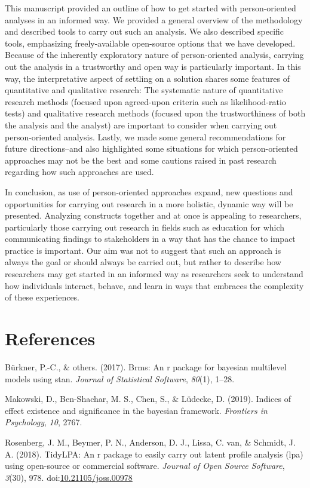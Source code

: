 \documentclass[man]{apa6}
\begin{document}
This manuscript provided an outline of how to get started with person-oriented
analyses in an informed way. We provided a general overview of the methodology
and described tools to carry out such an analysis. We also described specific
tools, emphasizing freely-available open-source options that we have developed.
Because of the inherently exploratory nature of person-oriented analysis,
carrying out the analysis in a trustworthy and open way is particularly
important. In this way, the interpretative aspect of settling on a solution
shares some features of quantitative and qualitative research: The systematic
nature of quantitative research methods (focused upon agreed-upon criteria such
as likelihood-ratio tests) and qualitative research methods (focused upon the
trustworthiness of both the analysis and the analyst) are important to consider
when carrying out person-oriented analysis. Lastly, we made some general
recommendations for future directions--and also highlighted some situations for
which person-oriented approaches may not be the best and some cautions raised in
past research regarding how such approaches are used.

In conclusion, as use of person-oriented approaches expand, new questions and
opportunities for carrying out research in a more holistic, dynamic way will be
presented. Analyzing constructs together and at once is appealing to
researchers, particularly those carrying out research in fields such as
education for which communicating findings to stakeholders in a way that has the
chance to impact practice is important. Our aim was not to suggest that such an
approach is always the goal or should always be carried out, but rather to
describe how researchers may get started in an informed way as researchers seek
to understand how individuals interact, behave, and learn in ways that embraces
the complexity of these experiences.

\newpage

\hypertarget{references}{%
\section{References}\label{references}}

\begingroup
\setlength{\parindent}{-0.5in}
\setlength{\leftskip}{0.5in}

\hypertarget{refs}{}
\leavevmode\hypertarget{ref-burkner2017}{}%
Bürkner, P.-C., \& others. (2017). Brms: An r package for bayesian multilevel models using stan. \emph{Journal of Statistical Software}, \emph{80}(1), 1--28.

\leavevmode\hypertarget{ref-makowski2019}{}%
Makowski, D., Ben-Shachar, M. S., Chen, S., \& Lüdecke, D. (2019). Indices of effect existence and significance in the bayesian framework. \emph{Frontiers in Psychology}, \emph{10}, 2767.

\leavevmode\hypertarget{ref-R-tidyLPA}{}%
Rosenberg, J. M., Beymer, P. N., Anderson, D. J., Lissa, C. van, \& Schmidt, J. A. (2018). TidyLPA: An r package to easily carry out latent profile analysis (lpa) using open-source or commercial software. \emph{Journal of Open Source Software}, \emph{3}(30), 978. doi:\href{https://doi.org/10.21105/joss.00978}{10.21105/joss.00978}

\endgroup
\end{document}
